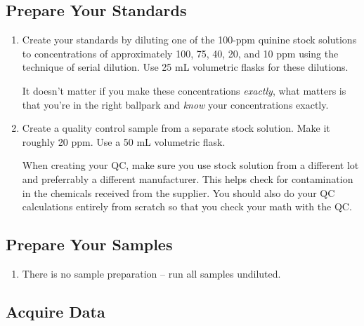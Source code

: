 \documentclass[]{tufte-book}
\providecommand{\tightlist}{%
  \setlength{\itemsep}{0pt}\setlength{\parskip}{0pt}}
\begin{document}
\hypertarget{prepare-your-standards}{%
\subsection{Prepare Your Standards}\label{prepare-your-standards}}

\begin{enumerate}
\def\labelenumi{\arabic{enumi}.}
\item
  Create your standards by diluting one of the 100-ppm quinine stock solutions to concentrations of approximately 100, 75, 40, 20, and 10 ppm using the technique of serial dilution. Use 25 mL volumetric flasks for these dilutions.

  \begin{marginfigure}
   It doesn't matter if you make these concentrations \emph{exactly}, what
   matters is that you're in the right ballpark and \emph{know} your
   concentrations exactly.
   \end{marginfigure}
\item
  Create a quality control sample from a separate stock solution. Make it roughly 20 ppm. Use a 50 mL volumetric flask.

  \begin{marginfigure}
   When creating your QC, make sure you use stock solution from a different
   lot and preferrably a different manufacturer. This helps check for
   contamination in the chemicals received from the supplier. You should
   also do your QC calculations entirely from scratch so that you check
   your math with the QC.
   \end{marginfigure}
\end{enumerate}

\hypertarget{prepare-your-samples}{%
\subsection{Prepare Your Samples}\label{prepare-your-samples}}

\begin{enumerate}
\def\labelenumi{\arabic{enumi}.}
\tightlist
\item
  There is no sample preparation -- run all samples undiluted.
\end{enumerate}

\hypertarget{acquire-data}{%
\subsection{Acquire Data}\label{acquire-data}}
\end{document}
